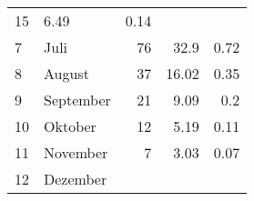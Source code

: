 \begin{longtable}{lXrrr}
       \num{15} &
       \num[round-mode=places,round-precision=2]{6,49} &
         \num[round-mode=places,round-precision=2]{0,14} \\

     7 &
     \multicolumn{1}{X}{ Juli   } &


       \num{76} &
       \num[round-mode=places,round-precision=2]{32,9} &
         \num[round-mode=places,round-precision=2]{0,72} \\

     8 &
     \multicolumn{1}{X}{ August   } &


       \num{37} &
       \num[round-mode=places,round-precision=2]{16,02} &
         \num[round-mode=places,round-precision=2]{0,35} \\

     9 &
     \multicolumn{1}{X}{ September   } &


       \num{21} &
       \num[round-mode=places,round-precision=2]{9,09} &
         \num[round-mode=places,round-precision=2]{0,2} \\

     10 &
     \multicolumn{1}{X}{ Oktober   } &


       \num{12} &
       \num[round-mode=places,round-precision=2]{5,19} &
         \num[round-mode=places,round-precision=2]{0,11} \\

     11 &
     \multicolumn{1}{X}{ November   } &


       \num{7} &
       \num[round-mode=places,round-precision=2]{3,03} &
         \num[round-mode=places,round-precision=2]{0,07} \\

     12 &
     \multicolumn{1}{X}{ Dezember   } &



\end{longtable}
